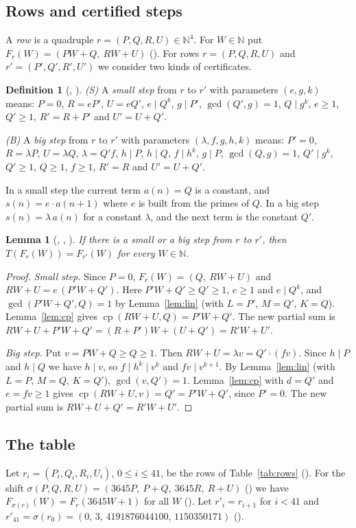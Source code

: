 \documentclass[11pt]{amsart}
\theoremstyle{plain}
\newtheorem{lemma}[theorem]{Lemma}
\theoremstyle{definition}
\newtheorem{definition}[theorem]{Definition}
\newcommand{\N}{\mathbb{N}}
\newcommand{\cp}{\operatorname{cp}}
\begin{document}
\subsection{Rows and certified steps}
A \emph{row} is a quadruple $r=(P,Q,R,U)\in\N^4$. For $W\in\N$ put $F_r(W)=(PW+Q,\ RW+U)$ ().
For rows $r=(P,Q,R,U)$ and $r'=(P',Q',R',U')$ we consider two kinds of certificates.

\begin{definition}[, ]\label{def:good}
\emph{(S)} A \emph{small step} from $r$ to $r'$ with parameters $(e,g,k)$ means:
$P=0$, $R=eP'$, $U=eQ'$, $e\mid Q^k$, $g\mid P'$, $\gcd(Q',g)=1$, $Q\mid g^k$, $e\ge1$, $Q'\ge1$, $R'=R+P'$ and $U'=U+Q'$.

\emph{(B)} A \emph{big step} from $r$ to $r'$ with parameters $(\lambda,f,g,h,k)$ means:
$P'=0$, $R=\lambda P$, $U=\lambda Q$, $\lambda=Q'f$, $h\mid P$, $h\mid Q$, $f\mid h^k$, $g\mid P$, $\gcd(Q,g)=1$, $Q'\mid g^k$, $Q'\ge1$, $Q\ge1$, $f\ge1$, $R'=R$ and $U'=U+Q'$.
\end{definition}

In a small step the current term $a(n)=Q$ is a constant, and $s(n)=e\cdot a(n+1)$ where $e$ is built from the primes of $Q$. In a big step $s(n)=\lambda\,a(n)$ for a constant $\lambda$, and the next term is the constant $Q'$.

\begin{lemma}[, , ]\label{lem:step}
If there is a small or a big step from $r$ to $r'$, then $T(F_r(W))=F_{r'}(W)$ for every $W\in\N$.
\end{lemma}

\begin{proof}
\emph{Small step.} Since $P=0$, $F_r(W)=(Q,\ RW+U)$ and $RW+U=e\,(P'W+Q')$. Here $P'W+Q'\ge Q'\ge1$, $e\ge1$ and $e\mid Q^k$, and $\gcd(P'W+Q',Q)=1$ by Lemma~\ref{lem:lin} (with $L=P'$, $M=Q'$, $K=Q$). Lemma~\ref{lem:cp} gives $\cp(RW+U,Q)=P'W+Q'$. The new partial sum is $RW+U+P'W+Q'=(R+P')W+(U+Q')=R'W+U'$.

\emph{Big step.} Put $v=PW+Q\ge Q\ge1$. Then $RW+U=\lambda v=Q'\cdot(fv)$. Since $h\mid P$ and $h\mid Q$ we have $h\mid v$, so $f\mid h^k\mid v^k$ and $fv\mid v^{k+1}$. By Lemma~\ref{lem:lin} (with $L=P$, $M=Q$, $K=Q'$), $\gcd(v,Q')=1$. Lemma~\ref{lem:cp} with $d=Q'$ and $e=fv\ge1$ gives $\cp(RW+U,v)=Q'=P'W+Q'$, since $P'=0$. The new partial sum is $RW+U+Q'=R'W+U'$.
\end{proof}

\subsection{The table}
Let $r_i=(P_i,Q_i,R_i,U_i)$, $0\le i\le41$, be the rows of Table~\ref{tab:rows} (). For the shift $\sigma(P,Q,R,U)=(3645P,\ P+Q,\ 3645R,\ R+U)$ () we have $F_{\sigma(r)}(W)=F_r(3645W+1)$ for all $W$ (). Let $r'_i=r_{i+1}$ for $i<41$ and $r'_{41}=\sigma(r_0)=(0,\,3,\,4191876044100,\,1150350171)$ ().
\end{document}
